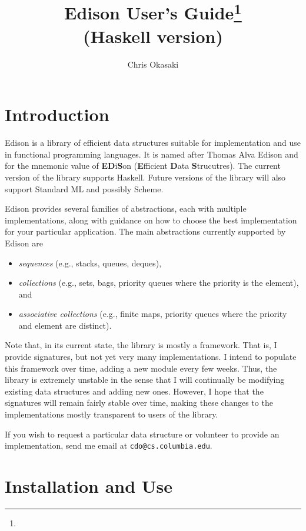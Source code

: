 \documentclass{report}
\title{Edison User's Guide\thanks{\CopyrightNotice} \\ (Haskell version)}
\author{Chris Okasaki}
\begin{document}
\maketitle
\tableofcontents
\listoffigures

\chapter{Introduction}

Edison is a library of efficient data structures suitable for
implementation and use in functional programming languages.  
It is named after Thomas Alva Edison and for the mnemonic value of 
{\bf ED}i{\bf S}on ({\bf E}fficient {\bf D}ata {\bf S}trucutres).  
The current version of the library supports Haskell.  Future versions
of the library will also support Standard ML and possibly Scheme.

Edison provides several families of abstractions, each with multiple
implementations, along with guidance on how to choose the best
implementation for your particular application.  The main abstractions
currently supported by Edison are 
\begin{itemize} 
\item \emph{sequences} (e.g., stacks, queues, deques), 
\item \emph{collections} (e.g., sets, bags, priority queues where 
  the priority is the element), and 
\item \emph{associative collections} (e.g., finite maps, priority queues 
  where the priority and element are distinct).
\end{itemize}

Note that, in its current state, the library is mostly a framework.
That is, I provide signatures, but not yet very many implementations.
I intend to populate this framework over time, adding a new module
every few weeks.  Thus, the library is extremely unstable in the sense
that I will continually be modifying existing data structures and
adding new ones.  However, I hope that the signatures will remain
fairly stable over time, making these changes to the implementations
mostly transparent to users of the library.

If you wish to request a particular data structure or volunteer to
provide an implementation, send me email at \texttt{cdo@cs.columbia.edu}.


\chapter{Installation and Use}
\end{document}
